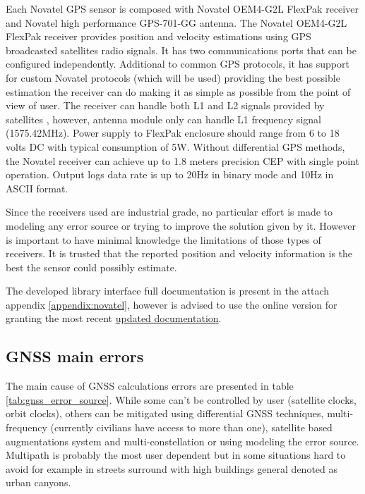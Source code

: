 Each  Novatel GPS sensor is composed with Novatel OEM4-G2L FlexPak receiver and
Novatel high performance GPS-701-GG antenna. The Novatel OEM4-G2L FlexPak
receiver provides position and velocity estimations using GPS broadcasted
satellites radio signals. It has two communications ports that can be configured
independently. Additional to common GPS protocols, it has support for custom
Novatel protocols (which will be used) providing the best possible estimation
the receiver can do making it as simple as possible from the point of view of
user. The receiver can handle both L1 and L2 signals provided by satellites
\cite{NovAtel2005_volume1}, however, antenna module only can handle L1 frequency
signal (1575.42MHz)\cite{NovAtel2013_antenna}. Power supply to FlexPak enclosure
should range from 6 to 18 volts DC with typical consumption of 5W. Without
differential GPS methods, the Novatel receiver can achieve up to 1.8 meters
precision \gls{CEP} with single point operation. Output logs data rate is up to
20Hz in binary mode and 10Hz in ASCII format.

Since the receivers used are industrial grade, no particular effort is made to modeling any error source or trying to improve the solution given by it. However is important to have minimal knowledge the limitations of those types of receivers. It is trusted that the reported position and velocity information is the best the sensor could possibly estimate.

The developed library interface full documentation is present in the attach appendix \ref{appendix:novatel}, however is advised to use the online version for granting the most recent \href{https://novatel-oem4-python.readthedocs.io/en/latest/}{updated documentation}.

\subsection{GNSS main errors}\label{subsection:GNSS_main_errors}

The main cause of \gls{GNSS} calculations errors are presented in table \ref{tab:gnss_error_source}.
While some can't be controlled by user (satellite clocks, orbit clocks), others can be mitigated using differential GNSS techniques, multi-frequency (currently civilians have access to more than one), satellite based augmentations system and multi-constellation or using modeling the error source. Multipath is probably the most user dependent but in some situations hard to avoid for example in streets surround with high buildings general denoted as urban canyons.


